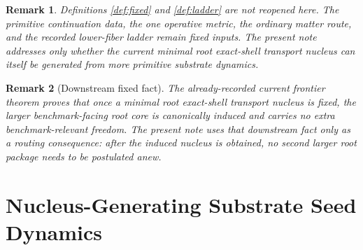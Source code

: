 \documentclass[11pt]{article}
\newtheorem{remark}{Remark}
\begin{document}
\begin{remark}
Definitions \ref{def:fixed} and \ref{def:ladder} are not reopened here. The primitive continuation data, the one operative metric, the ordinary matter route, and the recorded lower-fiber ladder remain fixed inputs. The present note addresses only whether the current minimal root exact-shell transport nucleus can itself be generated from more primitive substrate dynamics.
\end{remark}

\begin{remark}[Downstream fixed fact]
The already-recorded current frontier theorem proves that once a minimal root exact-shell transport nucleus is fixed, the larger benchmark-facing root core is canonically induced and carries no extra benchmark-relevant freedom. The present note uses that downstream fact only as a routing consequence: after the induced nucleus is obtained, no second larger root package needs to be postulated anew.
\end{remark}

\section{Nucleus-Generating Substrate Seed Dynamics}
\end{document}
